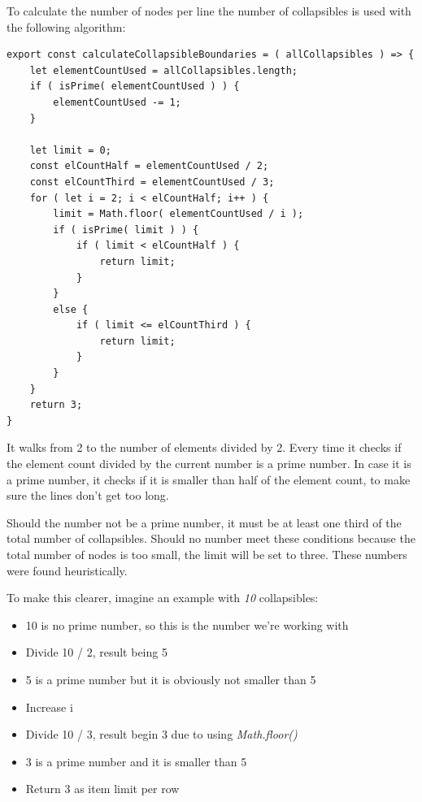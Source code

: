 To calculate the number of nodes per line the number of collapsibles is used with the following algorithm:
\lstset{language=JavaScript}
\begin{lstlisting}[caption={Algorithm to determine the number of Collapsibles per Row}]
export const calculateCollapsibleBoundaries = ( allCollapsibles ) => {
	let elementCountUsed = allCollapsibles.length;
	if ( isPrime( elementCountUsed ) ) {
		elementCountUsed -= 1;
	}

	let limit = 0;
	const elCountHalf = elementCountUsed / 2;
	const elCountThird = elementCountUsed / 3;
	for ( let i = 2; i < elCountHalf; i++ ) {
		limit = Math.floor( elementCountUsed / i );
		if ( isPrime( limit ) ) {
			if ( limit < elCountHalf ) {
				return limit;
			}
		}
		else {
			if ( limit <= elCountThird ) {
				return limit;
			}
		}
	}
	return 3;
}
\end{lstlisting}

It walks from 2 to the number of elements divided by 2. Every time it checks if the element count divided by the current number is a prime number. In case it is a prime number, it checks if it is smaller than half of the element count, to make sure the lines don't get too long.

Should the number not be a prime number, it must be at least one third of the total number of collapsibles. Should no number meet these conditions because the total number of nodes is too small, the limit will be set to three. These numbers were found heuristically.

To make this clearer, imagine an example with \emph{10} collapsibles:
\begin{itemize}
\item 10 is no prime number, so this is the number we're working with
\item Divide 10 / 2, result being 5
\item 5 is a prime number but it is obviously not smaller than 5
\item Increase i
\item Divide 10 / 3, result begin 3 due to using \emph{Math.floor()}
\item 3 is a prime number and it is smaller than 5
\item Return 3 as item limit per row
\end{itemize}

